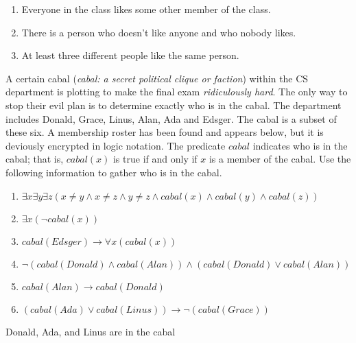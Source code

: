 \documentclass[]{exam}
\begin{document}
\begin{questions}
      \ifprintanswers\else
      \fi

      \begin{solution}
        \begin{enumerate}
          \item Everyone in the class likes some other member of the class.
          \item There is a person who doesn't like anyone and who nobody likes.
          \item At least three different people like the same person.
        \end{enumerate}
      \end{solution}

    \question A certain cabal (\emph{cabal: a secret political clique or
      faction}) within the CS department is plotting to make the final exam
      \emph{ridiculously hard}. The only way to stop their evil plan is to
      determine exactly who is in the cabal. The department includes Donald,
      Grace, Linus, Alan, Ada and Edsger. The cabal is a subset of these six. A
      membership roster has been found and appears below, but it is deviously
      encrypted in logic notation. The predicate $cabal$ indicates who is in the
      cabal; that is, $cabal(x)$ is true if and only if $x$ is a member of the
      cabal. Use the following information to gather who is in the cabal. 

      \begin{enumerate}
        \item $\exists x \exists y \exists z (x \neq y \land x \neq z \land y
          \neq z \land cabal(x) \land cabal(y) \land cabal(z))$
        \item $\exists x (\lnot cabal(x))$
        \item $cabal(Edsger) \rightarrow \forall x (cabal(x))$
        \item $\lnot (cabal(Donald) \land cabal(Alan)) \land (cabal(Donald) \lor
          cabal(Alan))$
        \item $cabal(Alan) \rightarrow cabal(Donald)$
        \item $(cabal(Ada) \lor cabal(Linus)) \rightarrow \lnot(cabal(Grace))$
      \end{enumerate}

      \ifprintanswers\else
      \fi

      \begin{solution}
        Donald, Ada, and Linus are in the cabal
      \end{solution}
  \end{questions}
\end{document}
